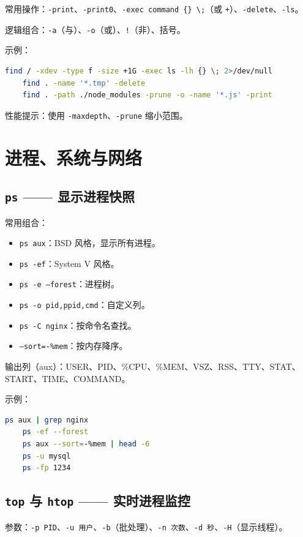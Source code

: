 常用操作：\texttt{-print}、\texttt{-print0}、\texttt{-exec command \{\} \textbackslash;}（或 \texttt{+}）、\texttt{-delete}、\texttt{-ls}。

逻辑组合：\texttt{-a}（与）、\texttt{-o}（或）、\texttt{!}（非）、括号。

示例：
\begin{lstlisting}[language=bash]
	find / -xdev -type f -size +1G -exec ls -lh {} \; 2>/dev/null
	find . -name '*.tmp' -delete
	find . -path ./node_modules -prune -o -name '*.js' -print
\end{lstlisting}

性能提示：使用 \texttt{-maxdepth}、\texttt{-prune} 缩小范围。

\section{进程、系统与网络}

\subsection*{\texttt{ps} —— 显示进程快照} 常用组合：
\begin{itemize}
\item \texttt{ps aux}：BSD 风格，显示所有进程。
\item \texttt{ps -ef}：System V 风格。
\item \texttt{ps -e --forest}：进程树。
\item \texttt{ps -o pid,ppid,cmd}：自定义列。
\item \texttt{ps -C nginx}：按命令名查找。
\item \texttt{--sort=-\%mem}：按内存降序。
\end{itemize}

输出列（aux）：USER、PID、\%CPU、\%MEM、VSZ、RSS、TTY、STAT、START、TIME、COMMAND。

示例：
\begin{lstlisting}[language=bash]
	ps aux | grep nginx
	ps -ef --forest
	ps aux --sort=-%mem | head -6
	ps -u mysql
	ps -fp 1234
\end{lstlisting}

\subsection*{\texttt{top} 与 \texttt{htop} —— 实时进程监控} 参数：\texttt{-p PID}、\texttt{-u 用户}、\texttt{-b}（批处理）、\texttt{-n 次数}、\texttt{-d 秒}、\texttt{-H}（显示线程）。

